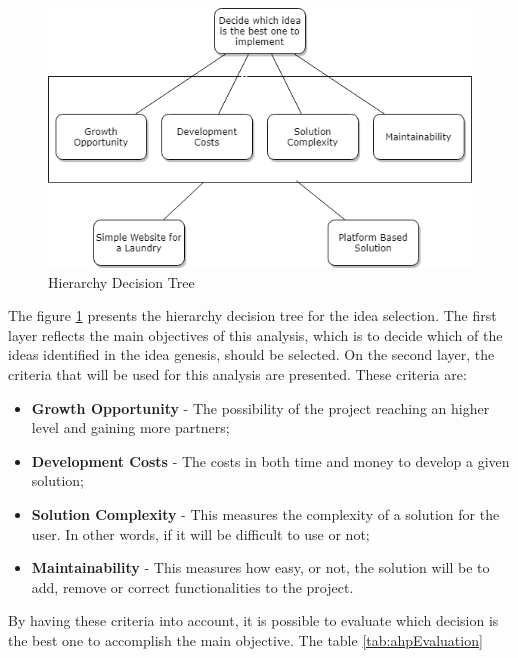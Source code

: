 \begin{figure}[htb]
\centering
\includegraphics[width=\textwidth,keepaspectratio]{chapters/Value_Analysis/assets/Decision_tree.png}
\caption[Hierarchy Decision Tree]{Hierarchy Decision Tree}
\label{fig:decisionTree}
\end{figure}
\par

The figure \ref{fig:decisionTree} presents the hierarchy decision tree for the idea selection. The first layer reflects the main objectives of this analysis, which is to decide which of the ideas identified in the idea genesis, should be selected. On the second layer, the criteria that will be used for this analysis are presented. These criteria are:
\begin{itemize}
    \item \textbf{Growth Opportunity} - The possibility of the project reaching an higher level and gaining more partners;
    \item \textbf{Development Costs} - The costs in both time and money to develop a given solution;
    \item \textbf{Solution Complexity} - This measures the complexity of a solution for the user. In other words, if it will be difficult to use or not;
    \item \textbf{Maintainability} - This measures how easy, or not, the solution will be to add, remove or correct functionalities to the project.
\end{itemize}
\par

By having these criteria into account, it is possible to evaluate which decision is the best one to accomplish the main objective. The table \ref{tab:ahpEvaluation}


